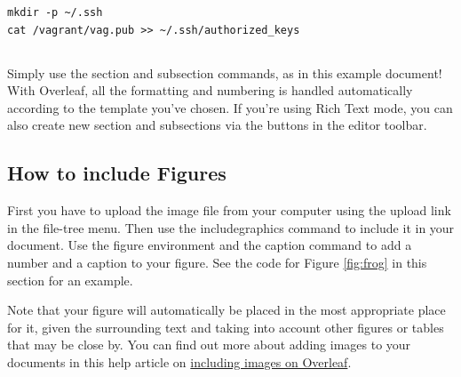 \documentclass{article}
\begin{document}
\begin{lstlisting}
mkdir -p ~/.ssh
cat /vagrant/vag.pub >> ~/.ssh/authorized_keys
\end{lstlisting}

\subsection{}
\subsection{}
\subsection{}
\subsection{}
\subsection{}
\subsection{}

Simply use the section and subsection commands, as in this example document! With Overleaf, all the formatting and numbering is handled automatically according to the template you've chosen. If you're using Rich Text mode, you can also create new section and subsections via the buttons in the editor toolbar.

\subsection{How to include Figures}

First you have to upload the image file from your computer using the upload link in the file-tree menu. Then use the includegraphics command to include it in your document. Use the figure environment and the caption command to add a number and a caption to your figure. See the code for Figure \ref{fig:frog} in this section for an example.

Note that your figure will automatically be placed in the most appropriate place for it, given the surrounding text and taking into account other figures or tables that may be close by. You can find out more about adding images to your documents in this help article on \href{https://www.overleaf.com/learn/how-to/Including_images_on_Overleaf}{including images on Overleaf}.
\end{document}
